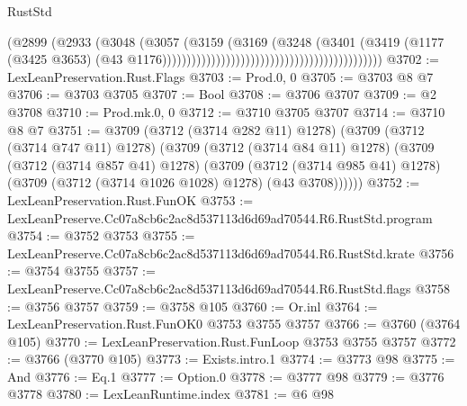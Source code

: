 \begin{lexlean}{RustStd}
\begin{coremodule}
                                                                        (@2899
                                                                          (@2933
                                                                            (@3048
                                                                              (@3057
                                                                                (@3159
                                                                                  (@3169
                                                                                    (@3248
                                                                                      (@3401
                                                                                        (@3419
                                                                                          (@1177
                                                                                            (@3425
                                                                                              @3653)
                                                                                            (@43
                                                                                              @1176)))))))))))))))))))))))))))))))))))))))))))))
@3702 := LexLeanPreservation.Rust.Flags
@3703 := Prod.{0, 0}
@3705 := @3703 @8 @7
@3706 := @3703 @3705
@3707 := Bool
@3708 := @3706 @3707
@3709 := @2 @3708
@3710 := Prod.mk.{0, 0}
@3712 := @3710 @3705 @3707
@3714 := @3710 @8 @7
@3751 := @3709
    (@3712 (@3714 @282 @11) @1278)
    (@3709
      (@3712 (@3714 @747 @11) @1278)
      (@3709
        (@3712 (@3714 @84 @11) @1278)
        (@3709
          (@3712 (@3714 @857 @41) @1278)
          (@3709
            (@3712 (@3714 @985 @41) @1278)
            (@3709 (@3712 (@3714 @1026 @1028) @1278) (@43 @3708))))))
@3752 := LexLeanPreservation.Rust.FunOK
@3753 := LexLeanPreserve.Cc07a8cb6c2ac8d537113d6d69ad70544.R6.RustStd.program
@3754 := @3752 @3753
@3755 := LexLeanPreserve.Cc07a8cb6c2ac8d537113d6d69ad70544.R6.RustStd.krate
@3756 := @3754 @3755
@3757 := LexLeanPreserve.Cc07a8cb6c2ac8d537113d6d69ad70544.R6.RustStd.flags
@3758 := @3756 @3757
@3759 := @3758 @105
@3760 := Or.inl
@3764 := LexLeanPreservation.Rust.FunOK0 @3753 @3755 @3757
@3766 := @3760 (@3764 @105)
@3770 := LexLeanPreservation.Rust.FunLoop @3753 @3755 @3757
@3772 := @3766 (@3770 @105)
@3773 := Exists.intro.{1}
@3774 := @3773 @98
@3775 := And
@3776 := Eq.{1}
@3777 := Option.{0}
@3778 := @3777 @98
@3779 := @3776 @3778
@3780 := LexLeanRuntime.index
@3781 := @6 @98

\end{coremodule}
\end{lexlean}
